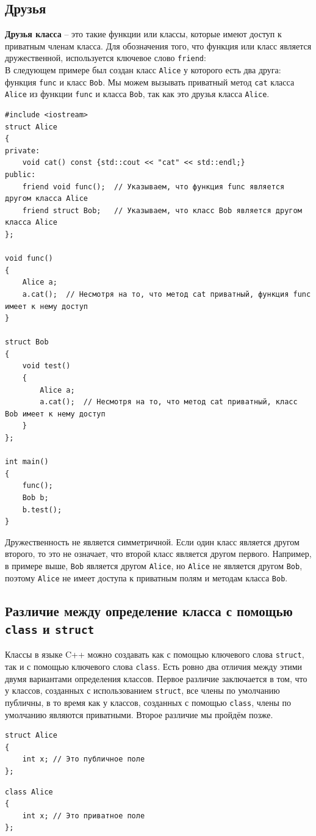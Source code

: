 \documentclass{article}
\begin{document}
\subsection*{Друзья}
\noindent \textbf{Друзья класса} -- это такие функции или классы, которые имеют доступ к приватным членам класса. Для обозначения того, что функция или класс является дружественной, используется ключевое слово \texttt{friend}:\\
В следующем примере был создан класс \texttt{Alice} у которого есть два друга: функция \texttt{func} и класс \texttt{Bob}. Мы можем вызывать приватный метод \texttt{cat} класса \texttt{Alice} из функции \texttt{func} и класса \texttt{Bob}, так как это друзья класса \texttt{Alice}.
\begin{lstlisting}
#include <iostream>
struct Alice 
{
private:
    void cat() const {std::cout << "cat" << std::endl;}
public:
    friend void func();  // Указываем, что функция func является другом класса Alice
    friend struct Bob;   // Указываем, что класс Bob является другом класса Alice
};

void func()
{
    Alice a;
    a.cat();  // Несмотря на то, что метод cat приватный, функция func имеет к нему доступ
}

struct Bob 
{
    void test()
    {
        Alice a;
        a.cat();  // Несмотря на то, что метод cat приватный, класс Bob имеет к нему доступ
    }
};

int main() 
{
    func();
    Bob b;
    b.test();
}
\end{lstlisting}
Дружественность не является симметричной. Если один класс является другом второго, то это не означает, что второй класс является другом первого. Например, в примере выше, \texttt{Bob} является другом \texttt{Alice}, но \texttt{Alice} не является другом \texttt{Bob}, поэтому \texttt{Alice} не имеет доступа к приватным полям и методам класса \texttt{Bob}.


\subsection*{Различие между определение класса с помощью \texttt{class} и \texttt{struct}}
Классы в языке C++ можно создавать как с помощью ключевого слова \texttt{struct}, так и с помощью ключевого слова \texttt{class}. Есть ровно два отличия между этими двумя вариантами определения классов.
Первое различие заключается в том, что у классов, созданных с использованием \texttt{struct}, все члены по умолчанию публичны, в то время как у классов, созданных с помощью \texttt{class}, члены по умолчанию являются приватными. Второе различие мы пройдём позже.
\begin{multicols}{2}\noindent
\begin{lstlisting}
struct Alice
{
	int x; // Это публичное поле
};
\end{lstlisting}

\begin{lstlisting}
class Alice
{
	int x; // Это приватное поле
};
\end{lstlisting} 
\end{multicols}
\end{document}

